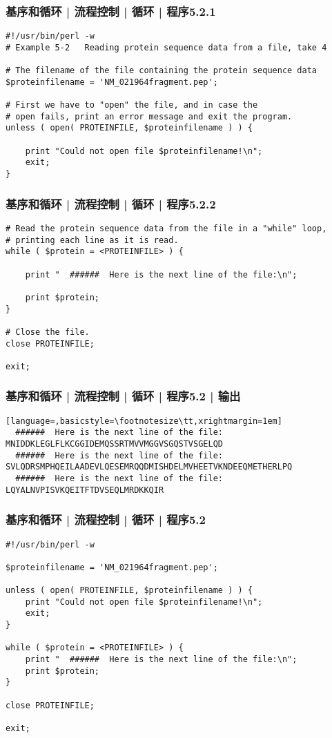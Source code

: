 \begin{frame}[fragile]
  \frametitle{基序和循环 | 流程控制 | 循环 | 程序5.2.1}
\begin{lstlisting}[basicstyle=\small\tt]
#!/usr/bin/perl -w
# Example 5-2   Reading protein sequence data from a file, take 4

# The filename of the file containing the protein sequence data
$proteinfilename = 'NM_021964fragment.pep';

# First we have to "open" the file, and in case the
# open fails, print an error message and exit the program.
unless ( open( PROTEINFILE, $proteinfilename ) ) {

    print "Could not open file $proteinfilename!\n";
    exit;
}
\end{lstlisting}  
\end{frame}

\begin{frame}[fragile]
  \frametitle{基序和循环 | 流程控制 | 循环 | 程序5.2.2}
\begin{lstlisting}[firstnumber=15]
# Read the protein sequence data from the file in a "while" loop,
# printing each line as it is read.
while ( $protein = <PROTEINFILE> ) {

    print "  ######  Here is the next line of the file:\n";

    print $protein;
}

# Close the file.
close PROTEINFILE;

exit;
\end{lstlisting}  
\end{frame}

\begin{frame}[fragile]
  \frametitle{基序和循环 | 流程控制 | 循环 | 程序5.2 | 输出}
  \begin{lstlisting}[language=,basicstyle=\footnotesize\tt,xrightmargin=1em]
  ######  Here is the next line of the file:
MNIDDKLEGLFLKCGGIDEMQSSRTMVVMGGVSGQSTVSGELQD
  ######  Here is the next line of the file:
SVLQDRSMPHQEILAADEVLQESEMRQQDMISHDELMVHEETVKNDEEQMETHERLPQ
  ######  Here is the next line of the file:
LQYALNVPISVKQEITFTDVSEQLMRDKKQIR
\end{lstlisting}  
\end{frame}

\begin{frame}[fragile]
  \frametitle{基序和循环 | 流程控制 | 循环 | \alert{程序5.2}}
\begin{lstlisting}[basicstyle=\footnotesize\tt]
#!/usr/bin/perl -w

$proteinfilename = 'NM_021964fragment.pep';

unless ( open( PROTEINFILE, $proteinfilename ) ) {
    print "Could not open file $proteinfilename!\n";
    exit;
}

while ( $protein = <PROTEINFILE> ) {
    print "  ######  Here is the next line of the file:\n";
    print $protein;
}

close PROTEINFILE;

exit;
\end{lstlisting}  
\end{frame}

